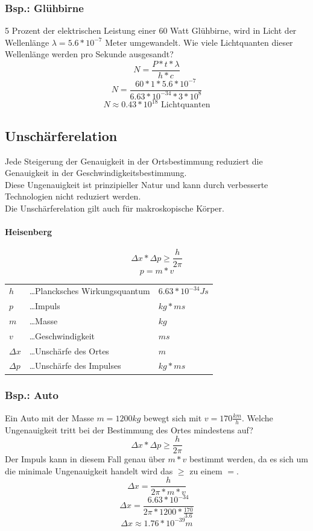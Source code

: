 \documentclass[a4paper,11pt]{article}
\begin{document}
\subsubsection{Bsp.: Glühbirne}
5 Prozent der elektrischen Leistung einer 60 Watt Glühbirne, wird in Licht der Wellenlänge $\lambda = 5.6 * 10^{-7}$ Meter umgewandelt.
Wie viele Lichtquanten dieser Wellenlänge werden pro Sekunde ausgesandt?
$$N = \frac{P*t*\lambda}{h*c}$$
$$N = \frac{60*1*5.6*10^{-7}}{6.63*10^{-34}*3*10^8}$$
\vspace{0.8 em}
$$N \approx 0.43*10^{18} \text{ Lichtquanten}$$

\newpage
\subsection{Unschärferelation}
Jede Steigerung der Genauigkeit in der Ortsbestimmung reduziert die Genauigkeit in der Geschwindigkeitsbestimmung.
\vspace{0.8 em}\\
Diese Ungenauigkeit ist prinzipieller Natur und kann durch verbesserte Technologien nicht reduziert werden.\\
Die Unschärferelation gilt auch für makroskopische Körper.
\paragraph{Heisenberg}
$$\Delta x * \Delta p \ge \frac{h}{2\pi}$$
\vspace{0.25 em}
$$p = m * v$$

\begin{center}
    \begin{tabular}{l l l}
        $h$ &\dots Plancksches Wirkungsquantum & $6.63 * 10^{-34} Js$\\
        $p$ &\dots Impuls & ${kg*m}{s}$\\
        $m$ &\dots Masse & ${kg}$\\
        $v$ &\dots Geschwindigkeit & ${m}{s}$\\
        $\Delta x$ &\dots Unschärfe des Ortes & ${m}$\\
        $\Delta p$ &\dots Unschärfe des Impulses & ${kg*m}{s}$
    \end{tabular}
\end{center}

\subsubsection{Bsp.: Auto}
Ein Auto mit der Masse $m = 1200 kg$ bewegt sich mit $v = 170 \frac{km}{h}$.
Welche Ungenauigkeit tritt bei der Bestimmung des Ortes mindestens auf?
$$\Delta x * \Delta p \ge \frac{h}{2\pi}$$
Der Impuls kann in diesem Fall genau über $m * v$ bestimmt werden, da es sich um die minimale Ungenauigkeit handelt wird das $\ge$ zu einem $=$.
$$\Delta x = \frac{h}{2\pi * m * v}$$
$$\Delta x = \frac{6.63 * 10^{-34}}{2\pi * 1200 * \frac{170}{3.6}}$$
$$\Delta x \approx 1.76 * 10^{-39} m$$
\end{document}

